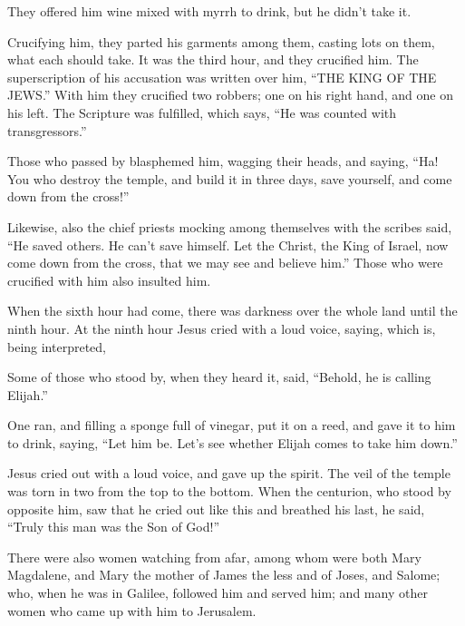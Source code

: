 {They offered him wine mixed with myrrh to drink, but he didn’t take it.
\par }{\PP {}Crucifying him, they parted his garments among them, casting lots on them, what each should take.
It was the third hour,
 and they crucified him.
The superscription of his accusation was written over him, “THE KING OF THE JEWS.”
With him they crucified two robbers; one on his right hand, and one on his left.
The Scripture was fulfilled, which says, “He was counted with transgressors.”
\par }{\PP {}Those who passed by blasphemed him, wagging their heads, and saying, “Ha! You who destroy the temple, and build it in three days,
save yourself, and come down from the cross!”
\par }{\PP {}Likewise, also the chief priests mocking among themselves with the scribes said, “He saved others. He can’t save himself.
Let the Christ, the King of Israel, now come down from the cross, that we may see and believe him.”
 Those who were crucified with him also insulted him.
\par }{\PP {}When the sixth hour
 had come, there was darkness over the whole land until the ninth hour.
At the ninth hour Jesus cried with a loud voice, saying,
{} which is, being interpreted,
{}
\par }{\PP {}Some of those who stood by, when they heard it, said, “Behold, he is calling Elijah.”
\par }{\PP {}One ran, and filling a sponge full of vinegar, put it on a reed, and gave it to him to drink, saying, “Let him be. Let’s see whether Elijah comes to take him down.”
\par }{\PP {}Jesus cried out with a loud voice, and gave up the spirit.
The veil of the temple was torn in two from the top to the bottom.
When the centurion, who stood by opposite him, saw that he cried out like this and breathed his last, he said, “Truly this man was the Son of God!”
\par }{\PP {}There were also women watching from afar, among whom were both Mary Magdalene, and Mary the mother of James the less and of Joses, and Salome;
who, when he was in Galilee, followed him and served him; and many other women who came up with him to Jerusalem.
}
